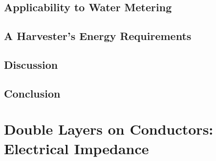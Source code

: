   \chapter{Applicability to Water Metering}
    \label{chap:part1_waterMetering}
    

  \chapter{A Harvester's Energy Requirements}
    \label{chap:part1_energyHarvestingRequirements}
    



  \chapter{Discussion}
  \label{chap:part_1_discussion}
  

  \chapter{Conclusion}
  \label{chap:part1_conclusion}



\part{Double Layers on Conductors: Electrical Impedance}
  \label{part:doubleLayersOnConductors}


